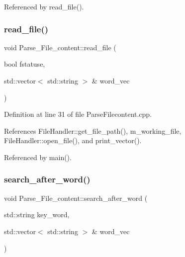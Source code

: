 Referenced by read\+\_\+file().

\mbox{\label{class_parse___file__content_ab268b997f33a90a9ce0881a8571b44d2}} 
\subsubsection{\texorpdfstring{read\+\_\+file()}{read\_file()}}
{\footnotesize\ttfamily void Parse\+\_\+\+File\+\_\+content\+::read\+\_\+file (\begin{DoxyParamCaption}\item[{bool}]{fstatuse,  }\item[{std\+::vector$<$ std\+::string $>$ \&}]{word\+\_\+vec }\end{DoxyParamCaption})}



Definition at line 31 of file Parse\+Filecontent.\+cpp.



References File\+Handler\+::get\+\_\+file\+\_\+path(), m\+\_\+working\+\_\+file, File\+Handler\+::open\+\_\+file(), and print\+\_\+vector().



Referenced by main().

\mbox{\label{class_parse___file__content_a945f2d6a47cc98bd34bb1f8290a8cb7c}} 
\subsubsection{\texorpdfstring{search\+\_\+after\+\_\+word()}{search\_after\_word()}}
{\footnotesize\ttfamily void Parse\+\_\+\+File\+\_\+content\+::search\+\_\+after\+\_\+word (\begin{DoxyParamCaption}\item[{std\+::string}]{key\+\_\+word,  }\item[{std\+::vector$<$ std\+::string $>$ \&}]{word\+\_\+vec }\end{DoxyParamCaption})}



